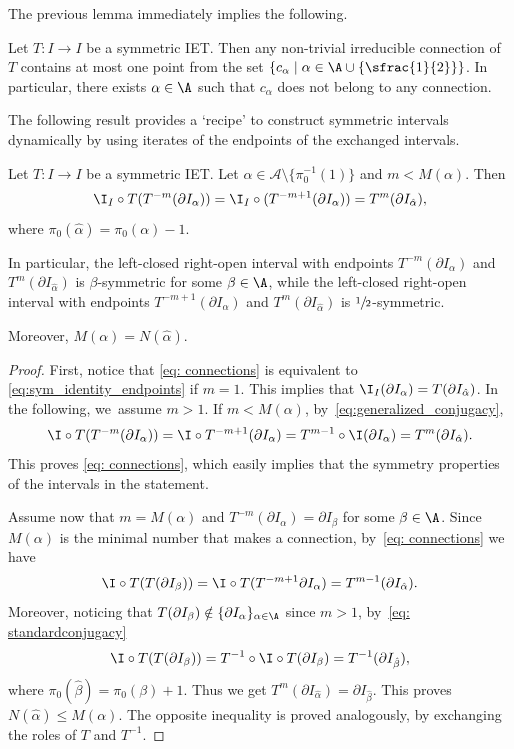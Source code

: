 The previous lemma immediately implies the following.

\begin{corollary}
\label{cor:centers_connections}
Let $T: I \to I$ be a symmetric IET. Then any non-trivial irreducible connection of $T$ contains at most one point from the set $\left\{c_\alpha \mid \alpha \in \A \cup \{\sfrac{1}{2}\} \right\}$. In particular, there exists $\alpha \in \A$ such that $c_\alpha$ does not belong to any connection.
\end{corollary}

The following result provides a `recipe' to construct symmetric intervals dynamically by using iterates of the endpoints of the exchanged intervals.

\begin{lemma}\label{lem: sym_endpoints}
{Let $T : I \to I$ be a symmetric IET.}
Let $\alpha\in\mathcal A\setminus\{\pi_0^{-1}(1)\}$ and $m< M(\alpha)$. Then
\begin{equation}\label{eq: connections}
\I_I\circ T(T^{-m}(\partial I_{\alpha}))={\I_I\circ (T^{-m+1}(\partial I_{\alpha}))}=T^m(\partial I_{\hat\alpha}),
\end{equation}
where $\pi_0(\hat\alpha)=\pi_0(\alpha)-1$.

In particular, the left-closed right-open interval with endpoints $T^{-m}(\partial I_{\alpha})$ and $T^m(\partial I_{\hat\alpha})$ is {$\beta$-symmetric for some $\beta\in\A$, while the left-closed right-open interval with endpoints $T^{-m+1}(\partial I_{\alpha})$ and $T^m(\partial I_{\hat\alpha})$ is $\sfrac{1}{2}$-symmetric}.

Moreover, $M(\alpha)= N(\hat\alpha)$.
\end{lemma}

\begin{proof}
First, notice that \eqref{eq: connections} is equivalent to \eqref{eq:sym_identity_endpoints} if $m = 1$. This implies that $\I_I(\partial I_\alpha) = T(\partial I_{\hat\alpha})$.
In the following, we~assume $m > 1$. If $m < M(\alpha)$, by~\eqref{eq:generalized_conjugacy},
\[
\I\circ T(T^{-m}(\partial I_{\alpha}))= \I \circ T^{-m + 1}(\partial I_\alpha) = T^{m - 1} \circ \I (\partial I_\alpha) = T^m(\partial I_{\hat \alpha}).
\]
This proves \eqref{eq: connections}, which easily implies that the symmetry properties of the intervals in the statement.

Assume now that $m=M(\alpha)$ and $T^{-m}(\partial I_{\alpha})=\partial I_{\beta}$ for some $\beta\in \A$. Since $M(\alpha)$ is the minimal number that makes a connection, by~\eqref{eq: connections} we have
\[
\I\circ T(T(\partial I_{\beta}))=\I\circ T(T^{-{m+1}}\partial I_{\alpha})=T^{m-1}(\partial I_{\hat\alpha}).
\]
Moreover, noticing that $T(\partial I_\beta) \notin \{\partial I_\alpha\}_{\alpha \in \A}$ since $m > 1$, by~\eqref{eq: standardconjugacy}
\[
\I\circ T(T(\partial I_{\beta}))=T^{-1}\circ\I\circ T(\partial I_{\beta})
=T^{-1}(\partial I_{\hat\beta}),
\]
where $\pi_0(\hat\beta)=\pi_0(\beta)+1$. Thus we get $T^{m}(\partial I_{\hat\alpha})=\partial I_{\hat\beta}$. This proves $N(\hat\alpha)\le M(\alpha)$. The opposite inequality is proved analogously, {by exchanging the roles of $T$ and $T^{-1}$.}
\end{proof}

